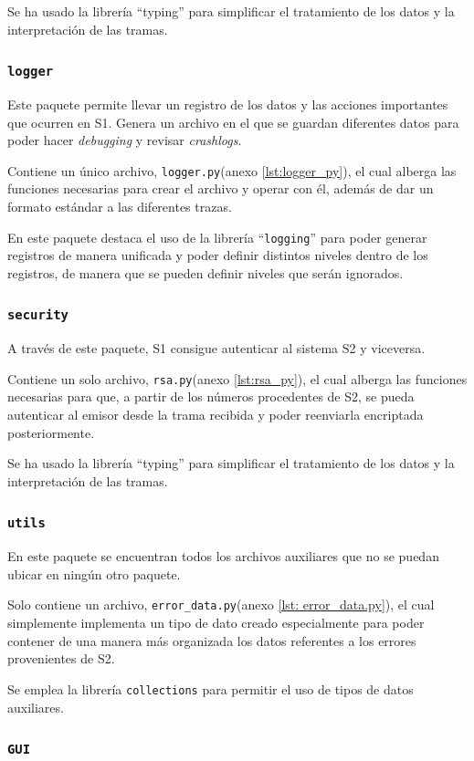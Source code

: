 Se ha usado la librería ``typing'' para simplificar el tratamiento de los datos y la interpretación de las tramas.

\subsubsection{\texttt{logger}}

Este paquete permite llevar un registro de los datos y las acciones importantes que ocurren en \ac{S1}. Genera un archivo en el que se guardan diferentes datos para poder hacer \textit{debugging} y revisar \textit{crashlogs}.

Contiene un único archivo, \texttt{logger.py}(anexo \ref{lst:logger_py}), el cual alberga las funciones necesarias para crear el archivo y operar con él, además de dar un formato estándar a las diferentes trazas.

En este paquete destaca el uso de la librería ``\texttt{logging}'' para poder generar registros de manera unificada y poder definir distintos niveles dentro de los registros, de manera que se pueden definir
niveles que serán ignorados.

\subsubsection{\texttt{security}}

A través de este paquete, \ac{S1} consigue autenticar al sistema \ac{S2} y viceversa.

Contiene un solo archivo, \texttt{rsa.py}(anexo \ref{lst:rsa_py}), el cual alberga las funciones necesarias para que, a partir de los números procedentes de \ac{S2}, se pueda autenticar al emisor desde la trama recibida y poder reenviarla encriptada posteriormente.

Se ha usado la librería ``typing'' para simplificar el tratamiento de los datos y la interpretación de las tramas.

\subsubsection{\texttt{utils}}

En este paquete se encuentran todos los archivos auxiliares que no se puedan ubicar en ningún otro paquete.

Solo contiene un archivo, \texttt{error\_data.py}(anexo \ref{lst: error_data.py}), el cual simplemente implementa un tipo de dato creado especialmente para poder contener de una manera más organizada los datos referentes a los errores provenientes de \ac{S2}.

Se emplea la librería \texttt{collections} para permitir el uso de tipos de datos auxiliares.


\subsubsection{\texttt{GUI}}


